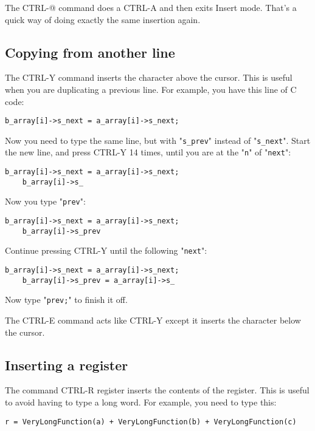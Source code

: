 The CTRL-@ command does a CTRL-A and then exits Insert mode.
That's a quick way of doing exactly the same insertion again.
\subsection{Copying from another line}
The CTRL-Y command inserts the character above the cursor.
This is useful when you are duplicating a previous line.
For example, you have this line of C code:

\begin{Verbatim}[samepage=true]
    b_array[i]->s_next = a_array[i]->s_next; 
\end{Verbatim}

Now you need to type the same line, but with "\verb!s_prev!" instead of "\verb!s_next!".
Start the new line, and press CTRL-Y 14 times, until you are at the "\verb!n!" of "\verb!next!":

\begin{Verbatim}[samepage=true]
    b_array[i]->s_next = a_array[i]->s_next; 
    b_array[i]->s_ 
\end{Verbatim}

Now you type "\verb!prev!":

\begin{Verbatim}[samepage=true]
    b_array[i]->s_next = a_array[i]->s_next; 
    b_array[i]->s_prev 
\end{Verbatim}

Continue pressing CTRL-Y until the following "\verb!next!":

\begin{Verbatim}[samepage=true]
    b_array[i]->s_next = a_array[i]->s_next; 
    b_array[i]->s_prev = a_array[i]->s_ 
\end{Verbatim}

Now type "\verb!prev;!" to finish it off.

The CTRL-E command acts like CTRL-Y except it inserts the character below the cursor.
\subsection{Inserting a register}
The command CTRL-R {register} inserts the contents of the register.
This is useful to avoid having to type a long word.
For example, you need to type this:

\begin{Verbatim}[samepage=true]
    r = VeryLongFunction(a) + VeryLongFunction(b) + VeryLongFunction(c) 
\end{Verbatim}

